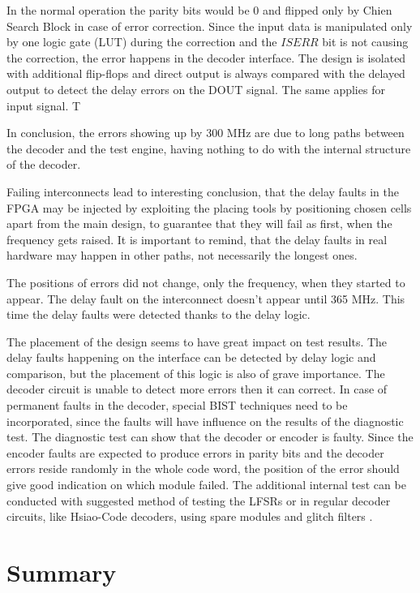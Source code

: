 In the normal operation the parity bits would be 0 and flipped only by Chien Search Block in case of error correction. Since the input data is manipulated only by one logic gate (LUT) during the correction and the $ISERR$ bit is not causing the correction, the error happens in the decoder interface. The design is isolated with additional flip-flops and direct output is always compared with the delayed output to detect the delay errors on the DOUT signal. The same applies for input signal. T

In conclusion, the errors showing up by 300 MHz are due to long paths between the decoder and the test engine, having nothing to do with the internal structure of the decoder.

Failing interconnects lead to interesting conclusion, that the delay faults in the FPGA may be injected by exploiting the placing tools by positioning chosen cells apart from the main design, to guarantee that they will fail as first, when the frequency gets raised. It is important to remind, that the delay faults in real hardware may happen in other paths, not necessarily the longest ones.

 The positions of errors did not change, only the frequency, when they started to appear. The delay fault on the interconnect doesn't appear until 365 MHz. This time the delay faults were detected thanks to the delay logic.

The placement of the design seems to have great impact on test results. The delay faults happening on the interface can be detected by delay logic and comparison, but the placement of this logic is also of grave importance. The decoder circuit is unable to detect more errors then it can correct. In case of permanent faults in the decoder, special BIST techniques need to be incorporated, since the faults will have influence on the results of the diagnostic test. The diagnostic test can show that the decoder or encoder is faulty. Since the encoder faults are expected to produce errors in parity bits and the decoder errors reside randomly in the whole code word, the position of the error should give good indication on which module failed. The additional internal test can be conducted with suggested method of testing the LFSRs \cite{art:Gleichner} or in regular decoder circuits, like Hsiao-Code decoders, using spare modules and glitch filters \cite{art:Dicorato}.


\chapter{Summary}

